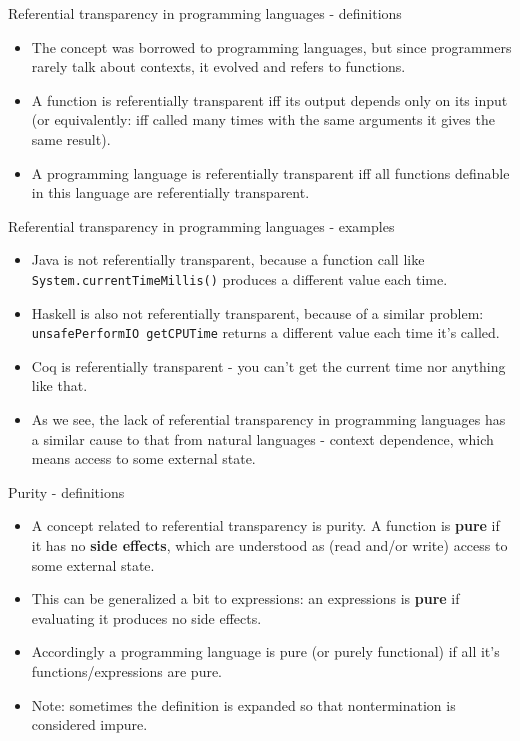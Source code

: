 \documentclass{beamer}
\begin{document}
\begin{frame}{Referential transparency in programming languages - definitions}
\begin{itemize}
	\item The concept was borrowed to programming languages, but since programmers rarely talk about contexts, it evolved and refers to functions.
	\item A function is referentially transparent iff its output depends only on its input (or equivalently: iff called many times with the same arguments it gives the same result).
	\item A programming language is referentially transparent iff all functions definable in this language are referentially transparent.
\end{itemize}
\end{frame}

\begin{frame}{Referential transparency in programming languages - examples}
\begin{itemize}
	\item Java is not referentially transparent, because a function call like \texttt{System.currentTimeMillis()} produces a different value each time.
	\item Haskell is also not referentially transparent, because of a similar problem: \texttt{unsafePerformIO getCPUTime} returns a different value each time it's called.
	\item Coq is referentially transparent - you can't get the current time nor anything like that.
	\item As we see, the lack of referential transparency in programming languages has a similar cause to that from natural languages - context dependence, which means access to some external state.
\end{itemize}
\end{frame}

\begin{frame}{Purity - definitions}
\begin{itemize}
	\item A concept related to referential transparency is purity. A function is \textbf{pure} if it has no \textbf{side effects}, which are understood as (read and/or write) access to some external state.
	\item This can be generalized a bit to expressions: an expressions is \textbf{pure} if evaluating it produces no side effects.
	\item Accordingly a programming language is pure (or purely functional) if all it's functions/expressions are pure.
	\item Note: sometimes the definition is expanded so that nontermination is considered impure.
\end{itemize}
\end{frame}
\end{document}
